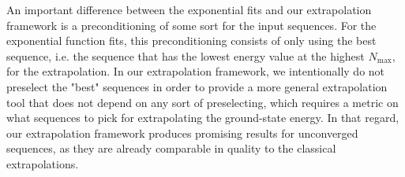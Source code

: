 An important difference between the exponential fits and our extrapolation framework is a preconditioning of some sort for the input sequences. For the exponential function fits, this preconditioning consists of only using the best sequence, i.e. the sequence that has the lowest energy value at the highest $N_\mathrm{max}$, for the extrapolation. In our extrapolation framework, we intentionally do not preselect the "best" sequences in order to provide a more general extrapolation tool that does not depend on any sort of preselecting, which requires a metric on what sequences to pick for extrapolating the ground-state energy. In that regard, our extrapolation framework produces promising results for unconverged sequences, as they are already comparable in quality to the classical extrapolations.
